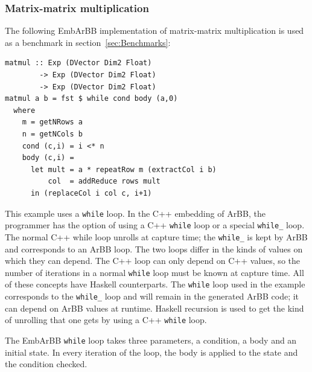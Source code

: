 
\subsubsection{Matrix-matrix multiplication}

The following EmbArBB implementation of matrix-matrix multiplication is used as a benchmark in section~\ref{sec:Benchmarks}:

\begin{verbatim} 
matmul :: Exp (DVector Dim2 Float) 
        -> Exp (DVector Dim2 Float) 
        -> Exp (DVector Dim2 Float) 
matmul a b = fst $ while cond body (a,0)
  where 
    m = getNRows a
    n = getNCols b 
    cond (c,i) = i <* n
    body (c,i) = 
      let mult = a * repeatRow m (extractCol i b)
          col  = addReduce rows mult 
      in (replaceCol i col c, i+1) 
\end{verbatim}

This example uses a {\tt while} loop. In the C++ embedding of ArBB, the programmer 
has the option of using a C++ {\tt while} loop or a special {\tt while\_} loop. The 
normal C++ while loop unrolls at capture time; the {\tt while\_} is kept by ArBB 
and corresponds to an ArBB loop. The two loops differ in the kinds of
values on which they can depend.
The C++ loop can only depend on C++ values, so
the number of iterations in a normal {\tt while} loop must be known at capture 
time. All of these concepts have Haskell counterparts. The {\tt while} loop used in the 
example corresponds to the {\tt while\_} loop and will remain in the generated ArBB 
code; it can depend on ArBB values at runtime.
Haskell recursion is used to get the kind of unrolling 
that one gets by using a C++ {\tt while} loop. 
 
The EmbArBB {\tt while} loop takes three parameters, a condition, a body and an initial state. 
In every iteration of the loop, the body is applied to the state and the condition checked.


